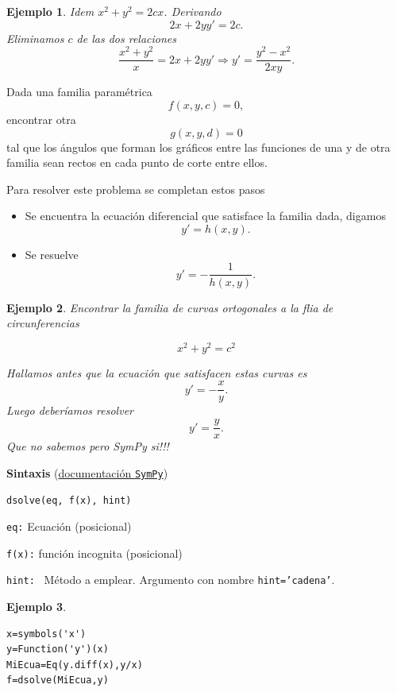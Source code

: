 \documentclass{article}
\newtheorem{ejemplo}{Ejemplo}}
\begin{document}
\begin{ejemplo} Idem $x^2+y^2=2cx$.  Derivando
\[2x+2yy'=2c.\]
Eliminamos $c$ de las dos relaciones
\[\frac{x^2+y^2}{x}=2x+2yy'\Rightarrow \boxed{y'=\frac{y^2-x^2}{2xy}}.\]
\end{ejemplo}


\begin{problema}
 Dada una familia paramétrica
 \[f(x,y,c)=0,\]
 encontrar otra
 \[g(x,y,d)=0\]
 tal que los ángulos que forman los gráficos entre las funciones de una y de otra familia sean rectos  en cada punto de corte entre ellos.
\end{problema}




Para resolver este problema se completan estos pasos
\begin{itemize}
 \item Se encuentra la ecuación diferencial que satisface la familia dada, digamos
 \[y'=h(x,y).\]
 \item Se resuelve
 \[y'=-\frac{1}{h(x,y)}.\]
\end{itemize}




\begin{ejemplo} Encontrar la familia de curvas ortogonales a la flia de circunferencias

\[x^2+y^2=c^2\]

Hallamos antes que la ecuación que satisfacen estas curvas es
\[y'=-\frac{x}{y}.\]
Luego deberíamos resolver
\[y'=\frac{y}{x}.\]
Que no sabemos pero SymPy si!!!

\end{ejemplo}

\begin{codigo}

\textbf{Sintaxis} (\href{http://docs.sympy.org/latest/modules/solvers/ode.html#}{documentación \texttt{SymPy}})

\texttt{dsolve(eq, f(x), hint)}

\texttt{eq:} Ecuación (posicional)

\texttt{f(x):} función incognita (posicional)

\texttt{hint: } Método a emplear. Argumento con nombre \texttt{hint='cadena'}.

\end{codigo}

\begin{ejemplo}
\end{ejemplo}
\begin{lstlisting}
x=symbols('x')
y=Function('y')(x)
MiEcua=Eq(y.diff(x),y/x)
f=dsolve(MiEcua,y)
\end{lstlisting}
\end{document}
